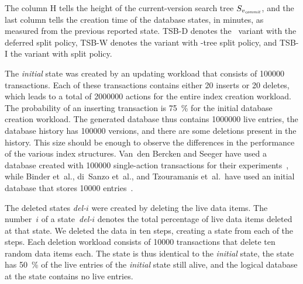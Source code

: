\begin{table}
\begin{center}

{The column H tells the height of the current-version search tree
$S_{\smash{v_{\text{\textit{commit}}}}}$, and the last column tells the creation time of the database
states, in minutes, as measured from the previous reported state.
TSB-D denotes the \TSBtree\ variant with the deferred split
policy, TSB-W denotes the variant with -tree split policy, and
TSB-I the variant with  split policy.}
\label{table:db-states}
\end{center}
\end{table}

The \emph{initial} state was created by an updating workload that consists of
\num{100000} transactions.
Each of these transactions contains either \num{20} inserts or \num{20}
deletes, which leads to a total of \num{2000000} actions for the entire
index creation workload. 
The probability of an inserting transaction is \SI{75}{\percent} for the
initial database creation workload.
The generated database thus contains \num{1000000} live entries, the
database history has \num{100000} versions, and there are some deletions
present in the history.
This size should be enough to observe the differences in the performance of the
various index structures.
Van~den Bercken and Seeger have used a database created with \num{100000}
single-action transactions for their
experiments~\cite{bercken:1996:multiversion}, while Binder et~al., di~Sanzo
et~al., and Tzouramanis et~al.\ have used an initial database that stores
\num{10000}
entries~\cite{binder:2007:evaluation,sanzo:2008:performance,tzouramanis:1999:overlapping}.

The deleted states \emph{del-$i$} were created by deleting the live
data items.
The number~$i$ of a state~\emph{del-$i$} denotes the total percentage of live
data items deleted at that state. 
We deleted the data in ten steps, creating a state from each of the steps.
Each deletion workload consists of \num{10000} transactions that delete
ten random data items each.
The  state is thus identical to the \emph{initial} state, the
 state has \SI{50}{\percent} of the live entries of
the \emph{initial} state still alive, and the logical database at the  
 state contains no live entries.

